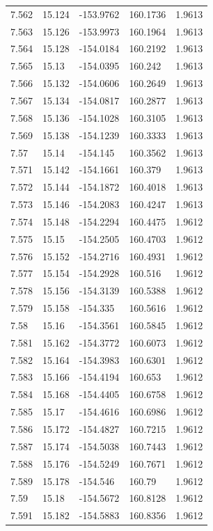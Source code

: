 \begin{tabular}{lllll}
7.562 & 15.124 & -153.9762 & 160.1736 & 1.9613 \\
7.563 & 15.126 & -153.9973 & 160.1964 & 1.9613 \\
7.564 & 15.128 & -154.0184 & 160.2192 & 1.9613 \\
7.565 & 15.13 & -154.0395 & 160.242 & 1.9613 \\
7.566 & 15.132 & -154.0606 & 160.2649 & 1.9613 \\
7.567 & 15.134 & -154.0817 & 160.2877 & 1.9613 \\
7.568 & 15.136 & -154.1028 & 160.3105 & 1.9613 \\
7.569 & 15.138 & -154.1239 & 160.3333 & 1.9613 \\
7.57 & 15.14 & -154.145 & 160.3562 & 1.9613 \\
7.571 & 15.142 & -154.1661 & 160.379 & 1.9613 \\
7.572 & 15.144 & -154.1872 & 160.4018 & 1.9613 \\
7.573 & 15.146 & -154.2083 & 160.4247 & 1.9613 \\
7.574 & 15.148 & -154.2294 & 160.4475 & 1.9612 \\
7.575 & 15.15 & -154.2505 & 160.4703 & 1.9612 \\
7.576 & 15.152 & -154.2716 & 160.4931 & 1.9612 \\
7.577 & 15.154 & -154.2928 & 160.516 & 1.9612 \\
7.578 & 15.156 & -154.3139 & 160.5388 & 1.9612 \\
7.579 & 15.158 & -154.335 & 160.5616 & 1.9612 \\
7.58 & 15.16 & -154.3561 & 160.5845 & 1.9612 \\
7.581 & 15.162 & -154.3772 & 160.6073 & 1.9612 \\
7.582 & 15.164 & -154.3983 & 160.6301 & 1.9612 \\
7.583 & 15.166 & -154.4194 & 160.653 & 1.9612 \\
7.584 & 15.168 & -154.4405 & 160.6758 & 1.9612 \\
7.585 & 15.17 & -154.4616 & 160.6986 & 1.9612 \\
7.586 & 15.172 & -154.4827 & 160.7215 & 1.9612 \\
7.587 & 15.174 & -154.5038 & 160.7443 & 1.9612 \\
7.588 & 15.176 & -154.5249 & 160.7671 & 1.9612 \\
7.589 & 15.178 & -154.546 & 160.79 & 1.9612 \\
7.59 & 15.18 & -154.5672 & 160.8128 & 1.9612 \\
7.591 & 15.182 & -154.5883 & 160.8356 & 1.9612 \\

\end{tabular}
